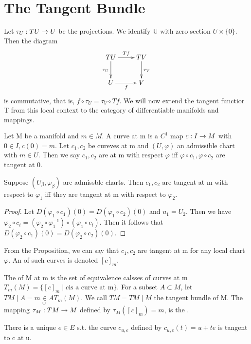 \section{The Tangent Bundle}
Let ${\tau_U}:{TU}\rightarrow{U}$ be the projections. We identify U with zero section $U\times \{0\}$. Then the diagram
\begin{displaymath}
    \xymatrix{
        TU \ar[r]^{Tf} \ar[d]_{\tau_U} & TV \ar[d]^{\tau_V} \\
        U  \ar[r]_f                    & V }
\end{displaymath}
is commutative, that is, $f\circ \tau_U=\tau_V\circ Tf$. We will now extend the tangent functior T from this local context to the 
category of differentiable manifolds and mappings.
\begin{definition}
Let M be a manifold and $m \in M$. A curve at m is a $C^1$ map ${c}:{I}\rightarrow{M}$ with $0\in I, c(0)=m$. Let $c_1,c_2$ be cureves at 
m and $(U,\varphi)$ an admissible chart with $m\in U$. Then we say $c_1,c_2$ are  at m with respect $\varphi$ iff 
$\varphi\circ c_1, \varphi\circ c_2$ are tangent at 0.
\end{definition}
\begin{prop}
Suppose $(U_\beta,\varphi_\beta)$ are admissble charts. Then $c_1, c_2$ are tangent at m with respect to $\varphi_1$ iff they are
tangent at m with respect to $\varphi_2$.
\end{prop}
\begin{proof}
Let $D(\varphi_1\circ c_1)(0)=D(\varphi_1\circ c_2)(0)$ and $u_1=U_2$. Then we have $\varphi_2\circ c_i=(\varphi_2\circ\varphi_1^{-1})
\circ (\varphi_1\circ c_i)$. Then it follows that $D(\varphi_2\circ c_1)(0)=D(\varphi_2\circ c_2)(0)$.
\end{proof}
From the Proposition, we can say that $c_1, c_2$ are tangent at m for any local chart $\varphi$. An  of such curves 
is denoted $[c]_m$.
\begin{definition}
The  of M at m is the set of equivalence calsses of curves at m $T_m(M)=\lbrace[c]_m\mid c \text{is a curve at m}\rbrace$.
For a subset $A\subset M$, let $TM\mid A=\underset{\cup}{m\in A}T_m(M)$. We call $TM=TM\mid M$ the tangent bundle of M. The mapping 
${\tau_M}:{TM}\rightarrow{M}$ defined by $\tau_M([c]_m)=m$, is the .
\end{definition}
\begin{prop}
There is a unique $e\in E$ s.t. the curve $c_{u,e}$ defined by $c_{u,e}(t)=u+te$ is tangent to c at u.
\end{prop}
